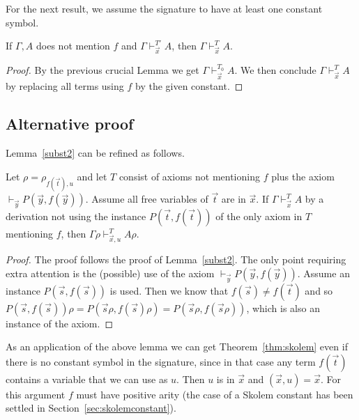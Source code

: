 \documentclass[10pt,a4paper]{article}
\begin{document}
 For the next result, we assume the signature to have at least one constant symbol.

\begin{theorem}\label{thm:skolem}
If $\Gamma,A$ does not mention $f$ and $\Gamma\vdash_{\vec{x}}^{T'} A$, then
$\Gamma\vdash_{\vec{x}}^T A$.
\end{theorem}

\begin{proof}
By the previous crucial Lemma we get $\Gamma\vdash_{\vec{x}}^{T_0} A$. We then conclude
$\Gamma\vdash_{\vec{x}}^T A$ by replacing all terms using $f$ by the given constant.
\end{proof}

\subsection{Alternative proof}

Lemma~\ref{subst2} can be refined as follows.

\begin{lemma}\label{subst3}
Let $\rho = \rho_{f(\vec{t}),u}$ and let $T$ consist of axioms not
mentioning $f$ plus the axiom $\vdash_{\vec{y}} P(\vec{y},f(\vec{y}))$.
Assume all free variables of $\vec{t}$ are in $\vec{x}$. If
$\Gamma\vdash_{\vec{x}}^T A$ by a derivation not using the instance $P(\vec{t},f(\vec{t}))$
of the only axiom in $T$ mentioning $f$, then $\Gamma\rho\vdash_{\vec{x},u}^T A\rho$.
\end{lemma}

\begin{proof}
The proof follows the proof of Lemma~\ref{subst2}. The only point requiring extra 
attention is the (possible) use of the axiom $\vdash_{\vec{y}} P(\vec{y},f(\vec{y}))$.
Assume an instance $P(\vec{s},f(\vec{s}))$ is used. Then we know that
$f(\vec{s}) \neq f(\vec{t})$ and so 
$P(\vec{s},f(\vec{s}))\rho
=P(\vec{s}\rho,f(\vec{s})\rho)
=P(\vec{s}\rho,f(\vec{s}\rho))$,
which is also an instance of the axiom.
\end{proof}

As an application of the above lemma we can get Theorem~\ref{thm:skolem}
even if there is no constant symbol in the signature, since in that case
any term $f(\vec{t})$ contains a variable that we can use as $u$. 
Then $u$ is in $\vec{x}$ and $(\vec{x},u)=\vec{x}$.
For this argument $f$ must have positive arity (the case of a 
Skolem constant has been settled in Section~\ref{sec:skolemconstant}).
\end{document}
